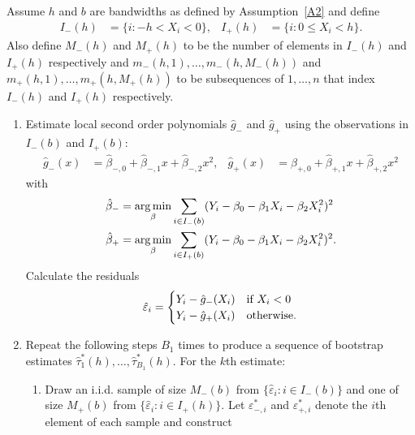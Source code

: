 \documentclass[12pt,fleqn]{article}
\begin{document}
\begin{algorithm}\label{Alg1}
  Assume $h$ and $b$ are bandwidths as defined by Assumption~\ref{A2} and define
  \begin{align*}
    I_-(h) &= \{i : -h < X_{i} < 0\}, &
    I_+(h) &= \{i : 0 \leq X_{i} < h\}.
  \end{align*}
  Also define $M_-(h)$ and $M_+(h)$ to be the number of elements in $I_-(h)$ and
  $I_+(h)$ respectively and $m_-(h,1),\dots,m_-(h,M_-(h))$ and
  $m_+(h,1),\dots,m_+(h,M_+(h))$ to be subsequences of $1,\dots,n$ that index
  $I_-(h)$ and $I_+(h)$ respectively.
  \begin{enumerate}
  \item Estimate local second order polynomials $\hat g_-$ and $\hat g_+$ using
    the observations in $I_-(b)$ and $I_+(b)$:
    \begin{align}
      \label{eq:2}
      \hat g_-(x)
      &= \hat\beta_{-,0} + \hat\beta_{-,1} x + \hat\beta_{-,2} x^2,
      &\hat g_+(x)
      &= \hat\beta_{+,0} + \hat\beta_{+,1} x + \hat\beta_{+,2} x^2
    \end{align}
    with
    \begin{align*}
      \hat\beta_- &= \operatorname*{arg\,min}_\beta \sum_{i \in I_-(b)}
      (Y_i - \beta_0 - \beta_1 X_i - \beta_2 X_i^2)^2 \\
      \hat\beta_+ &= \operatorname*{arg\,min}_\beta \sum_{i \in I_+(b)}
      (Y_i - \beta_0 - \beta_1 X_i - \beta_2 X_i^2)^2.
    \end{align*}
    Calculate the residuals
    \begin{equation}
      \label{eq:3}
      \hat\varepsilon_{i} =
      \begin{cases}
        Y_{i} - \hat g_-(X_{i}) & \text{if}\ X_{i} < 0 \\
        Y_{i} - \hat g_+(X_{i}) & \text{otherwise}.
      \end{cases}
    \end{equation}
  \item Repeat the following steps $B_1$ times to produce a sequence of
    bootstrap estimates $\hat\tau_1^*(h),\dots,\hat\tau_{B_1}^*(h)$. For the
    $k$th estimate:
    \begin{enumerate}
    \item Draw an i.i.d. sample of size $M_-(b)$ from
      $\{\hat\varepsilon_i : i \in I_-(b)\}$ and one of size $M_+(b)$ from
      $\{\hat\varepsilon_i : i \in I_+(h)\}$. Let $\varepsilon_{-,i}^{*}$ and
      $\varepsilon_{+,i}^{*}$ denote the $i$th element of each sample and
      construct

\end{enumerate}
\end{enumerate}
\end{algorithm}
\end{document}

